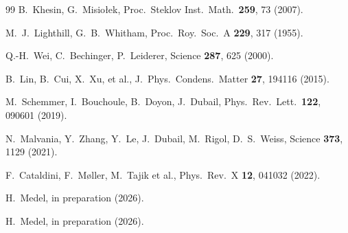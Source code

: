 \documentclass[aps,pre,twocolumn,superscriptaddress,longbibliography,floatfix]{revtex4-2}
\begin{document}
\begin{thebibliography}{99}
B.~Khesin, G.~Misio{\l}ek,
Proc.~Steklov Inst.~Math.\ \textbf{259}, 73 (2007).

M.~J.~Lighthill, G.~B.~Whitham,
Proc.~Roy.~Soc.~A \textbf{229}, 317 (1955).

Q.-H.~Wei, C.~Bechinger, P.~Leiderer,
Science \textbf{287}, 625 (2000).

B.~Lin, B.~Cui, X.~Xu, et al.,
J.~Phys.\ Condens.~Matter \textbf{27}, 194116 (2015).

M.~Schemmer, I.~Bouchoule, B.~Doyon, J.~Dubail,
Phys.~Rev.~Lett.\ \textbf{122}, 090601 (2019).

N.~Malvania, Y.~Zhang, Y.~Le, J.~Dubail, M.~Rigol, D.~S.~Weiss,
Science \textbf{373}, 1129 (2021).

F.~Cataldini, F.~M{\o}ller, M.~Tajik et al.,
Phys.~Rev.~X \textbf{12}, 041032 (2022).

H.~Medel,
in preparation (2026).

H.~Medel,
in preparation (2026).

\end{thebibliography}
\end{document}
